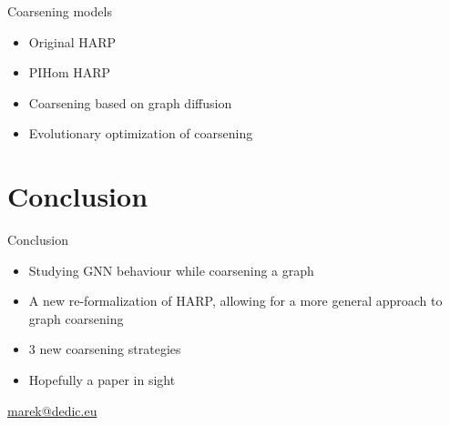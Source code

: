\documentclass[10pt]{beamer}
\begin{document}
\begin{frame}{Coarsening models}
	\begin{itemize}
		\item Original HARP
		\item PIHom HARP
		\item Coarsening based on graph diffusion
		\item Evolutionary optimization of coarsening
	\end{itemize}
\end{frame}

\section{Conclusion}

\begin{frame}{Conclusion}
	\centering
	\begin{itemize}
		\item Studying GNN behaviour while coarsening a graph
		\item A new re-formalization of HARP, allowing for a more general approach to graph coarsening
		\item 3 new coarsening strategies
		\item Hopefully a paper in sight
	\end{itemize}
\end{frame}

\begin{frame}
	\titlepage
	\hfill{}\url{marek@dedic.eu}\hspace{1cm}
	\vspace{0.5cm}
\end{frame}
\end{document}

